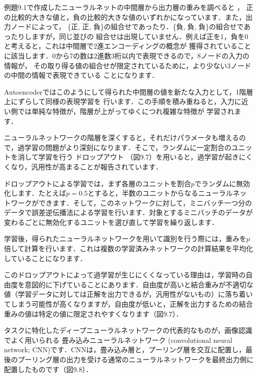 
例題9.1で作成したニューラルネットの中間層から出力層の重みを調べると
，
正の比較的大きな値と，負の比較的大きな値のいずれかになっています．また，出力ノードによって，
\{正, 正, 負\}の組合せであったり．\{負, 負, 負\}の組合せであったりしますが，同じ並びの
組合せは出現していません．例えば正を1，負を0と考えると，これは中間層で2進エンコーディングの概念が
獲得されていることに該当します．0から7の数は2進数3桁以内で表現できるので，8ノードの入力の情報が，
その取り得る値の組合せが限定されているために，より少ない3ノードの中間の情報で表現できている
ことになります．


Autoencoderではこのようにして得られた中間層の値を新たな入力として，1階層上にずらして同様の表現学習を
行います．この手順を積み重ねると，入力に近い側では単純な特徴が，階層が上がってゆくにつれ複雑な特徴が
学習されます．


ニューラルネットワークの階層を深くすると，それだけパラメータも増えるので，過学習の問題がより深刻になります．そこで，ランダムに一定割合のユニットを消して学習を行う
ドロップアウト
（図9.7）を用いると，過学習が起きにくくなり，汎用性が高まることが報告されています．

ドロップアウトによる学習では，まず各層のユニットを割合$p$でランダムに無効化します．たとえば$p=0.5$とすると，半数のユニットからなるニューラルネットワークができます．そして，このネットワークに対して，ミニバッチ一つ分のデータで誤差逆伝播法による学習を行います．対象とするミニバッチのデータが変わるごとに無効化するユニットを選び直して学習を繰り返します．

学習後，得られたニューラルネットワークを用いて識別を行う際には，重みを$p$倍して計算を行います．これは複数の学習済みネットワークの計算結果を平均化していることになります．

このドロップアウトによって過学習が生じにくくなっている理由は，学習時の自由度を意図的に下げていることにあります．自由度が高いと結合重みが不適切な値（学習データに対しては正解を出力できるが，汎用性がないもの）に落ち着いてしまう可能性が高くなりますが，自由度が低いと，正解を出力するための結合重みの値は特定の値に限定されやすくなります（図9.7）．


タスクに特化したディープニューラルネットワークの代表的なものが，画像認識でよく用いられる
畳み込みニューラルネットワーク
(convolutional neural network; CNN)です．CNNは，畳み込み層と，プーリング層を交互に配置し，最後のプーリング層の出力を受ける通常のニューラルネットワークを最終出力側に配置したものです（図9.8）．

